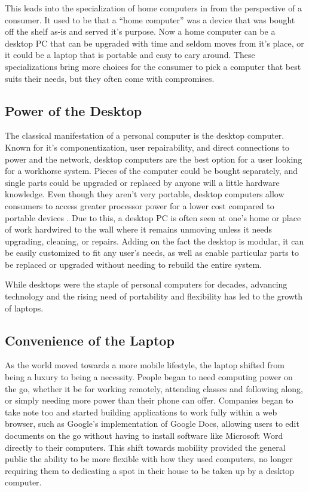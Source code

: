 This leads into the specialization of home computers in from the perspective of a consumer.
It used to be that a \enquote{home computer} was a device that was bought off the shelf as-is and served it's purpose.
Now a home computer can be a desktop PC that can be upgraded with time and seldom moves from it's place, or it could be a laptop that is portable and easy to cary around.
These specializations bring more choices for the consumer to pick a computer that best suits their needs, but they often come with compromises.

\subsection{Power of the Desktop}\label{subsec:PowerOfTheDesktop}

The classical manifestation of a personal computer is the desktop computer.
Known for it's componentization, user repairability, and direct connections to power and the network, desktop computers are the best option for a user looking for a workhorse system.
Pieces of the computer could be bought separately, and single parts could be upgraded or replaced by anyone will a little hardware knowledge.
Even though they aren't very portable, desktop computers allow consumers to access greater processor power for a lower cost compared to portable devices \citep{Meyer20145RS}.
Due to this, a desktop PC is often seen at one's home or place of work hardwired to the wall where it remains unmoving unless it needs upgrading, cleaning, or repairs.
Adding on the fact the desktop is modular, it can be easily customized to fit any user's needs, as well as enable particular parts to be replaced or upgraded without needing to rebuild the entire system.

While desktops were the staple of personal computers for decades, advancing technology and the rising need of portability and flexibility has led to the growth of laptops.


\subsection{Convenience of the Laptop}\label{subsec:ConvenienceOfTheLaptop}

As the world moved towards a more mobile lifestyle, the laptop shifted from being a luxury to being a necessity.
People began to need computing power on the go, whether it be for working remotely, attending classes and following along, or simply needing more power than their phone can offer.
Companies began to take note too and started building applications to work fully within a web browser, such as Google's implementation of Google Docs, allowing users to edit documents on the go without having to install software like Microsoft Word directly to their computers.
This shift towards mobility provided the general public the ability to be more flexible with how they used computers, no longer requiring them to dedicating a spot in their house to be taken up by a desktop computer.

